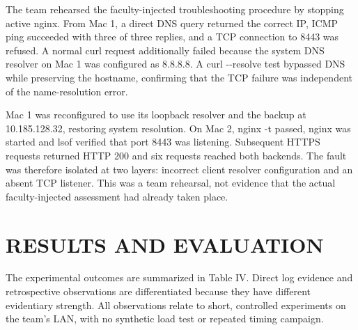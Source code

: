 \documentclass[conference]{IEEEtran}
\begin{document}
The team rehearsed the faculty-injected troubleshooting procedure by
stopping active nginx. From Mac 1, a direct DNS query returned the
correct IP, ICMP ping succeeded with three of three replies, and a TCP
connection to 8443 was refused. A normal curl request additionally
failed because the system DNS resolver on Mac 1 was configured as
8.8.8.8. A curl -\/-resolve test bypassed DNS while preserving the
hostname, confirming that the TCP failure was independent of the
name-resolution error.

Mac 1 was reconfigured to use its loopback resolver and the backup at
10.185.128.32, restoring system resolution. On Mac 2, nginx -t passed,
nginx was started and lsof verified that port 8443 was listening.
Subsequent HTTPS requests returned HTTP 200 and six requests reached
both backends. The fault was therefore isolated at two layers: incorrect
client resolver configuration and an absent TCP listener. This was a
team rehearsal, not evidence that the actual faculty-injected assessment
had already taken place.

\section{RESULTS AND EVALUATION}\label{v.-results-and-evaluation}

The experimental outcomes are summarized in Table IV. Direct log
evidence and retrospective observations are differentiated because they
have different evidentiary strength. All observations relate to short,
controlled experiments on the team's LAN, with no synthetic load test or
repeated timing campaign.
\end{document}
